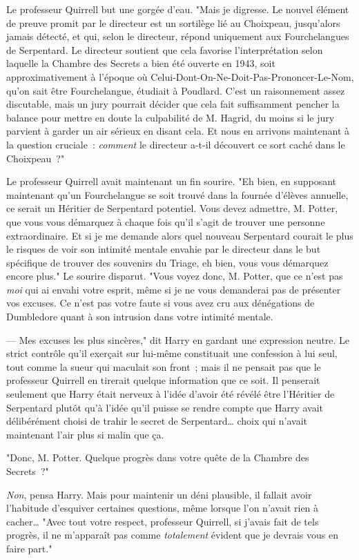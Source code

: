 Le professeur Quirrell but une gorgée d'eau. "Mais je digresse. Le nouvel élément de preuve promit par le directeur est un sortilège lié au Choixpeau, jusqu'alors jamais détecté, et qui, selon le directeur, répond uniquement aux Fourchelangues de Serpentard. Le directeur soutient que cela favorise l'interprétation selon laquelle la Chambre des Secrets a bien été ouverte en 1943, soit approximativement à l'époque où Celui-Dont-On-Ne-Doit-Pas-Prononcer-Le-Nom, qu'on sait être Fourchelangue, étudiait à Poudlard. C'est un raisonnement assez discutable, mais un jury pourrait décider que cela fait suffisamment pencher la balance pour mettre en doute la culpabilité de M. Hagrid, du moins si le jury parvient à garder un air sérieux en disant cela. Et nous en arrivons maintenant à la question cruciale~: \emph{comment} le directeur a-t-il découvert ce sort caché dans le Choixpeau~?"

Le professeur Quirrell avait maintenant un fin sourire. "Eh bien, en supposant maintenant qu'un Fourchelangue se soit trouvé dans la fournée d'élèves annuelle, ce serait un Héritier de Serpentard potentiel. Vous devez admettre, M. Potter, que vous vous démarquez à chaque fois qu'il s'agit de trouver une personne extraordinaire. Et si je me demande alors quel nouveau Serpentard courait le plus le risques de voir son intimité mentale envahie par le directeur dans le but spécifique de trouver des souvenirs du Triage, eh bien, vous vous démarquez encore plus." Le sourire disparut. "Vous voyez donc, M. Potter, que ce n'est pas \emph{moi} qui ai envahi votre esprit, même si je ne vous demanderai pas de présenter vos excuses. Ce n'est pas votre faute si vous avez cru aux dénégations de Dumbledore quant à son intrusion dans votre intimité mentale.

--- Mes excuses les plus sincères," dit Harry en gardant une expression neutre. Le strict contrôle qu'il exerçait sur lui-même constituait une confession à lui seul, tout comme la sueur qui maculait son front~; mais il ne pensait pas que le professeur Quirrell en tirerait quelque information que ce soit. Il penserait seulement que Harry était nerveux à l'idée d'avoir été révélé être l'Héritier de Serpentard plutôt qu'à l'idée qu'il puisse se rendre compte que Harry avait délibérément choisi de trahir le secret de Serpentard… choix qui n'avait maintenant l'air plus si malin que ça.

"Donc, M. Potter. Quelque progrès dans votre quête de la Chambre des Secrets~?"

\emph{Non}, pensa Harry. Mais pour maintenir un déni plausible, il fallait avoir l'habitude d'esquiver certaines questions, même lorsque l'on n'avait rien à cacher… "Avec tout votre respect, professeur Quirrell, si j'avais fait de tels progrès, il ne m'apparaît pas comme \emph{totalement} évident que je devrais vous en faire part."

